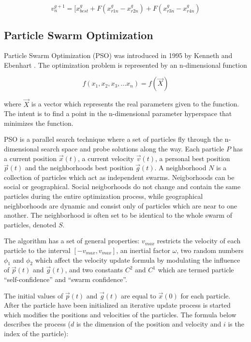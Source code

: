 \begin{equation}
v_{n}^{g+1} = [ x_{best}^{g} + F(x_{r1n}^{g} - x_{r2n}^{g}) + F(x_{r3n}^{g} - x_{r4n}^{g})
\end{equation}

\subsection{Particle Swarm Optimization}

Particle Swarm Optimization (PSO) \cite{Das2008} was introduced in 1995 by Kenneth and Ebenhart \cite{eberhart1995new}. The optimization problem is represented by an n-dimensional function

\begin{equation}
  f(x_1,x_2,x_3,...x_n) = f(\vec{X})
\end{equation}

where $\vec{X}$ is a vector which represents the real parameters given to the function. The intent is to find a point in the n-dimensional parameter hyperspace that minimizes the function.

PSO is a parallel search technique where a set of particles  fly through the n-dimensional search space and probe solutions along the way. Each particle $P$ has a current position $\vec{x}(t)$, a current velocity $\vec{v}(t)$, a personal best position $\vec{p}(t)$ and the neighborhoods best position $\vec{g}(t)$. A neighborhood $N$ is a collection of particles which act as independent swarms. Neigborhoods can be social or geographical. Social neigborhoods do not change and contain the same particles during the entire optimization process, while geographical neighborhoods are dynamic and consist only of particles which are near to one another. The neighborhood is often set to be identical to the whole swarm of particles, denoted $S$.

The algorithm has a set of general properties: $v_{max}$ restricts the velocity of each particle to the interval $[-v_{max},v_{max}]$, an inertial factor $\omega$, two random numbers $\phi_1$ and $\phi_2$ which affect the velocity update formula by modulating the influence of $\vec{p}(t)$ and $\vec{g}(t)$, and two constants $C^2$ and $C^1$ which are termed particle “self-confidence” and “swarm confidence”.

The initial values of $\vec{p}(t)$ and $\vec{g}(t)$ are equal to $\vec{x}(0)$ for each particle. After the particle have been initialized an iterative update process is started which modifies the positions and velocities of the particles. The formula below describes the process ($d$ is the dimension of the position and velocity and $i$ is the index of the particle):

